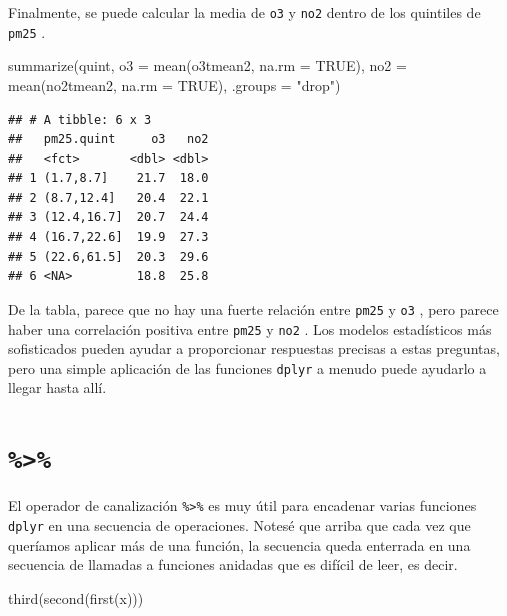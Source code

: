 \documentclass[
]{book}
\newenvironment{Shaded}{\begin{snugshade}}{\end{snugshade}}
\newcommand{\AttributeTok}[1]{\textcolor[rgb]{0.77,0.63,0.00}{#1}}
\newcommand{\ConstantTok}[1]{\textcolor[rgb]{0.00,0.00,0.00}{#1}}
\newcommand{\FunctionTok}[1]{\textcolor[rgb]{0.00,0.00,0.00}{#1}}
\newcommand{\NormalTok}[1]{#1}
\newcommand{\StringTok}[1]{\textcolor[rgb]{0.31,0.60,0.02}{#1}}
\begin{document}
Finalmente, se puede calcular la media de \texttt{o3} y \texttt{no2} dentro de los quintiles de \texttt{pm25} .

\begin{Shaded}
\begin{Highlighting}[]
\FunctionTok{summarize}\NormalTok{(quint, }\AttributeTok{o3 =} \FunctionTok{mean}\NormalTok{(o3tmean2, }\AttributeTok{na.rm =} \ConstantTok{TRUE}\NormalTok{), }
          \AttributeTok{no2 =} \FunctionTok{mean}\NormalTok{(no2tmean2, }\AttributeTok{na.rm =} \ConstantTok{TRUE}\NormalTok{),}
          \AttributeTok{.groups =} \StringTok{"drop"}\NormalTok{)}
\end{Highlighting}
\end{Shaded}

\begin{verbatim}
## # A tibble: 6 x 3
##   pm25.quint     o3   no2
##   <fct>       <dbl> <dbl>
## 1 (1.7,8.7]    21.7  18.0
## 2 (8.7,12.4]   20.4  22.1
## 3 (12.4,16.7]  20.7  24.4
## 4 (16.7,22.6]  19.9  27.3
## 5 (22.6,61.5]  20.3  29.6
## 6 <NA>         18.8  25.8
\end{verbatim}

De la tabla, parece que no hay una fuerte relación entre \texttt{pm25} y \texttt{o3} , pero parece haber una correlación positiva entre \texttt{pm25} y \texttt{no2} . Los modelos estadísticos más sofisticados pueden ayudar a proporcionar respuestas precisas a estas preguntas, pero una simple aplicación de las funciones \texttt{dplyr} a menudo puede ayudarlo a llegar hasta allí.

\hypertarget{section}{%
\section{\texorpdfstring{\texttt{\%\textgreater{}\%}}{\%\textgreater\%}}\label{section}}

El operador de canalización \texttt{\%\textgreater{}\%} es muy útil para encadenar varias funciones \texttt{dplyr} en una secuencia de operaciones. Notesé que arriba que cada vez que queríamos aplicar más de una función, la secuencia queda enterrada en una secuencia de llamadas a funciones anidadas que es difícil de leer, es decir.

\begin{Shaded}
\begin{Highlighting}[]
\FunctionTok{third}\NormalTok{(}\FunctionTok{second}\NormalTok{(}\FunctionTok{first}\NormalTok{(x)))}
\end{Highlighting}
\end{Shaded}
\end{document}
